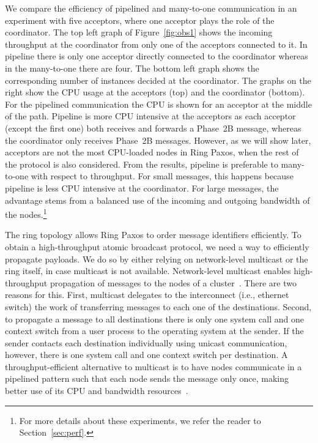 \documentclass[final,3p,times,twocolumn,authoryear]{elsarticle}
\begin{document}
We compare the efficiency of pipelined and many-to-one communication in an experiment with five acceptors, where one acceptor plays the role of the coordinator. The top left graph of Figure~\ref{fig:obs1} shows the incoming throughput at the coordinator from only one of the acceptors connected to it. In pipeline there is only one acceptor directly connected to the coordinator whereas in the many-to-one there are four. 
The bottom left graph shows the corresponding number of instances decided at the coordinator. 
The graphs on the right show the CPU usage at the acceptors (top) and the coordinator (bottom). 
For the pipelined communication the CPU is shown for an acceptor at the middle of the path. 
Pipeline is more CPU intensive at the acceptors as each acceptor (except the first one) both receives and forwards a Phase~2B message, whereas the coordinator only receives Phase~2B messages. 
However, as we will show later, acceptors are not the most CPU-loaded nodes in Ring Paxos, when the rest of the protocol is also considered. 
From the results, pipeline is preferable to many-to-one with respect to throughput. 
For small messages, this happens because pipeline is less CPU intensive at the coordinator. For large messages, the advantage stems from a balanced use of the incoming and outgoing bandwidth of the nodes.\footnote{For more details about these experiments, we refer the reader to Section~\ref{sec:perf}.}

The ring topology allows Ring Paxos to order message identifiers efficiently.  To obtain a high-throughput atomic broadcast protocol, we need a way to efficiently propagate payloads.  We do so by either relying on network-level multicast or the ring itself, in case multicast is not available.  Network-level multicast enables high-throughput propagation of messages to the nodes of a cluster~\cite{Vigfusson2010}. There are two reasons for this. First, multicast delegates to the interconnect (i.e., ethernet switch) the work of transferring messages to each one of the destinations. Second, to propagate a message to all destinations there is only one system call and one context switch from a user process to the operating system at the sender. If the sender contacts each destination individually using unicast communication, however, there is one system call and one context switch per destination. A throughput-efficient alternative to multicast is to have nodes communicate in a pipelined pattern such that each node sends the message only once, making better use of its CPU and bandwidth resources~\cite{Guerraoui2010}.
\end{document}
